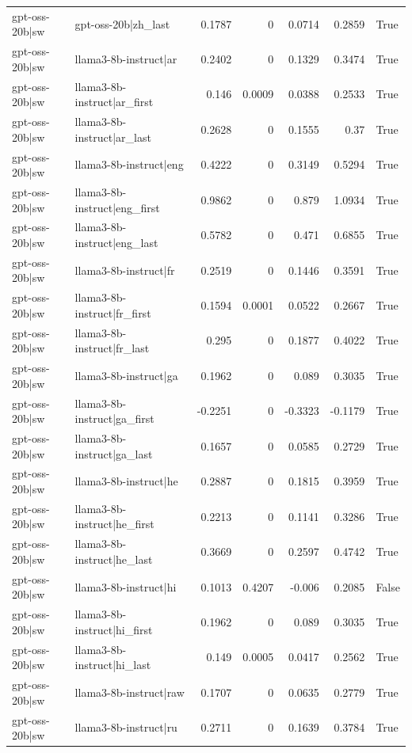 \begin{table}
\begin{tabular}{l l r r r r l}
gpt-oss-20b|sw & gpt-oss-20b|zh_last & 0.1787 & 0 & 0.0714 & 0.2859 & True \\
gpt-oss-20b|sw & llama3-8b-instruct|ar & 0.2402 & 0 & 0.1329 & 0.3474 & True \\
gpt-oss-20b|sw & llama3-8b-instruct|ar_first & 0.146 & 0.0009 & 0.0388 & 0.2533 & True \\
gpt-oss-20b|sw & llama3-8b-instruct|ar_last & 0.2628 & 0 & 0.1555 & 0.37 & True \\
gpt-oss-20b|sw & llama3-8b-instruct|eng & 0.4222 & 0 & 0.3149 & 0.5294 & True \\
gpt-oss-20b|sw & llama3-8b-instruct|eng_first & 0.9862 & 0 & 0.879 & 1.0934 & True \\
gpt-oss-20b|sw & llama3-8b-instruct|eng_last & 0.5782 & 0 & 0.471 & 0.6855 & True \\
gpt-oss-20b|sw & llama3-8b-instruct|fr & 0.2519 & 0 & 0.1446 & 0.3591 & True \\
gpt-oss-20b|sw & llama3-8b-instruct|fr_first & 0.1594 & 0.0001 & 0.0522 & 0.2667 & True \\
gpt-oss-20b|sw & llama3-8b-instruct|fr_last & 0.295 & 0 & 0.1877 & 0.4022 & True \\
gpt-oss-20b|sw & llama3-8b-instruct|ga & 0.1962 & 0 & 0.089 & 0.3035 & True \\
gpt-oss-20b|sw & llama3-8b-instruct|ga_first & -0.2251 & 0 & -0.3323 & -0.1179 & True \\
gpt-oss-20b|sw & llama3-8b-instruct|ga_last & 0.1657 & 0 & 0.0585 & 0.2729 & True \\
gpt-oss-20b|sw & llama3-8b-instruct|he & 0.2887 & 0 & 0.1815 & 0.3959 & True \\
gpt-oss-20b|sw & llama3-8b-instruct|he_first & 0.2213 & 0 & 0.1141 & 0.3286 & True \\
gpt-oss-20b|sw & llama3-8b-instruct|he_last & 0.3669 & 0 & 0.2597 & 0.4742 & True \\
gpt-oss-20b|sw & llama3-8b-instruct|hi & 0.1013 & 0.4207 & -0.006 & 0.2085 & False \\
gpt-oss-20b|sw & llama3-8b-instruct|hi_first & 0.1962 & 0 & 0.089 & 0.3035 & True \\
gpt-oss-20b|sw & llama3-8b-instruct|hi_last & 0.149 & 0.0005 & 0.0417 & 0.2562 & True \\
gpt-oss-20b|sw & llama3-8b-instruct|raw & 0.1707 & 0 & 0.0635 & 0.2779 & True \\
gpt-oss-20b|sw & llama3-8b-instruct|ru & 0.2711 & 0 & 0.1639 & 0.3784 & True \\

\end{tabular}
\end{table}
